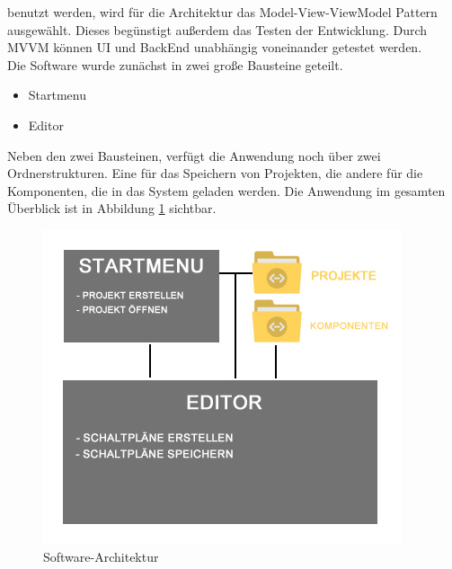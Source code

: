 benutzt werden, wird für die Architektur das Model-View-ViewModel Pattern ausgewählt. Dieses begünstigt außerdem das Testen der Entwicklung. 
Durch MVVM können UI und BackEnd unabhängig voneinander getestet werden.
\\
Die Software wurde zunächst in zwei große Bausteine geteilt.
\begin{itemize}
    \item Startmenu
    \item Editor
\end{itemize} 
Neben den zwei Bausteinen, verfügt die Anwendung noch über zwei Ordnerstrukturen. Eine für das Speichern von Projekten, die andere für 
die Komponenten, die in das System geladen werden. Die Anwendung im gesamten Überblick ist in Abbildung \ref{pic:softwarearchitektur} 
sichtbar.
\\
\begin{figure}[hbt!]
    \centering
    \includegraphics{4Systementwurf/Bilder/softwarearchitektur}
    \caption{Software-Architektur}
    \label{pic:softwarearchitektur}
\end{figure}
\newpage
